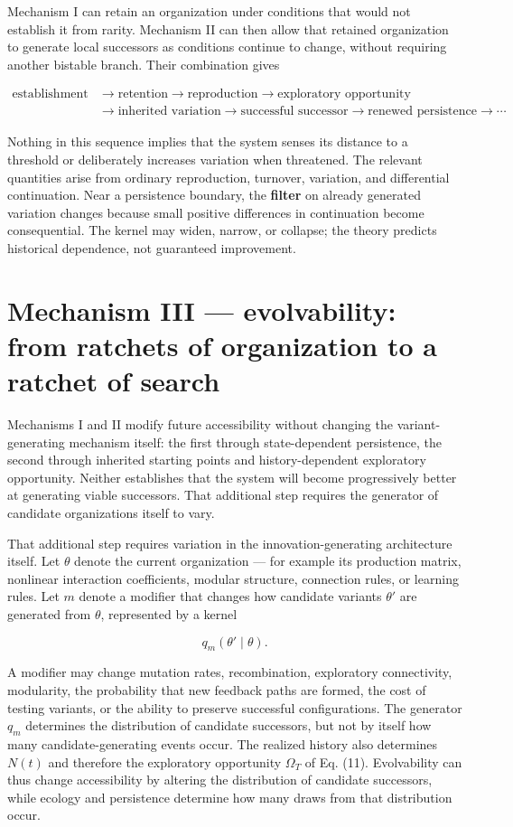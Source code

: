 \documentclass[11pt]{article}
\begin{document}
Mechanism I can retain an organization under conditions that would not
establish it from rarity. Mechanism II can then allow that retained
organization to generate local successors as conditions continue to
change, without requiring another bistable branch. Their combination
gives

\[
\begin{aligned}
\text{establishment} &\to \text{retention} \to \text{reproduction} \to \text{exploratory opportunity} \\
&\to \text{inherited variation} \to \text{successful successor} \to \text{renewed persistence} \to \cdots
\end{aligned}
\]

Nothing in this sequence implies that the system senses its distance to
a threshold or deliberately increases variation when threatened. The
relevant quantities arise from ordinary reproduction, turnover,
variation, and differential continuation. Near a persistence boundary,
the \textbf{filter} on already generated variation changes because small
positive differences in continuation become consequential. The kernel
may widen, narrow, or collapse; the theory predicts historical
dependence, not guaranteed improvement.

\section{Mechanism III --- evolvability: from ratchets of
organization to a ratchet of
search}
Mechanisms I and II modify future accessibility without changing the
variant-generating mechanism itself: the first through state-dependent
persistence, the second through inherited starting points and
history-dependent exploratory opportunity. Neither establishes that the
system will become progressively better at generating viable successors.
That additional step requires the generator of candidate organizations
itself to vary.

That additional step requires variation in the innovation-generating
architecture itself. Let \(\theta\) denote the current organization ---
for example its production matrix, nonlinear interaction coefficients,
modular structure, connection rules, or learning rules. Let \(m\) denote
a modifier that changes how candidate variants \(\theta'\) are generated
from \(\theta\), represented by a kernel

\[
q_m(\theta' \mid \theta).
\]

A modifier may change mutation rates, recombination, exploratory
connectivity, modularity, the probability that new feedback paths are
formed, the cost of testing variants, or the ability to preserve
successful configurations. The generator \(q_m\) determines the
distribution of candidate successors, but not by itself how many
candidate-generating events occur. The realized history also determines
\(N(t)\) and therefore the exploratory opportunity \(\Omega_T\) of Eq.
(11). Evolvability can thus change accessibility by altering the
distribution of candidate successors, while ecology and persistence
determine how many draws from that distribution occur.
\end{document}
